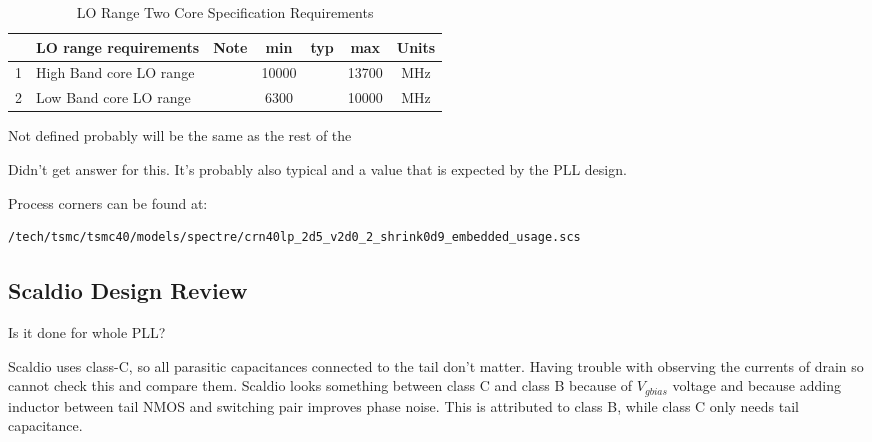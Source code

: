 \begin{table}[ht]
	\centering
	\begin{tabular}{|c|l|c|c|c|c|c|}
		\hline
		& LO range requirements & Note & min & typ & max & Units \\
		\hline
		1 & High Band core LO range &  & 10000  &  & 13700 & MHz \\ 
		\hline
		2 & Low Band core LO range &  & 6300 &  & 10000 & MHz \\ 
		\hline
	\end{tabular}
	\caption{LO Range Two Core Specification Requirements} 
\end{table}

\begin{question}
	Not defined probably will be the same as the rest of the 
\end{question}


\begin{question}
	Didn't get answer for this. It's probably also typical and a value that is expected by the PLL design.
\end{question}


Process corners can be found at:

\begin{verbatim}
/tech/tsmc/tsmc40/models/spectre/crn40lp_2d5_v2d0_2_shrink0d9_embedded_usage.scs
\end{verbatim}

\subsection{Scaldio Design Review}

\begin{question}
Is it done for whole PLL?
\end{question}

\begin{question}
	Scaldio uses class-C, so all parasitic capacitances connected to the tail don't matter. Having trouble with observing the currents of drain so cannot check this and compare them. Scaldio looks something between class C and class B because of $V_{gbias}$ voltage and because adding inductor between tail NMOS and switching pair improves phase noise. This is attributed to class B, while class C only needs tail capacitance.
\end{question}

